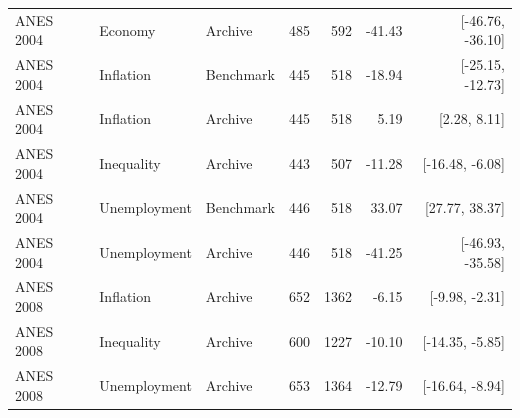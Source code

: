 \begin{longtable}{lllrrrr}
ANES 2004 & Economy & Archive & 485 &  592 & -41.43 & [-46.76, -36.10] \\
ANES 2004 & Inflation & Benchmark & 445 &  518 & -18.94 & [-25.15, -12.73] \\
ANES 2004 & Inflation & Archive & 445 &  518 & 5.19 & [2.28, 8.11] \\
ANES 2004 & Inequality & Archive & 443 &  507 & -11.28 & [-16.48, -6.08] \\
ANES 2004 & Unemployment & Benchmark & 446 &  518 & 33.07 & [27.77, 38.37] \\
ANES 2004 & Unemployment & Archive & 446 &  518 & -41.25 & [-46.93, -35.58] \\
ANES 2008 & Inflation & Archive & 652 & 1362 & -6.15 & [-9.98, -2.31] \\
ANES 2008 & Inequality & Archive & 600 & 1227 & -10.10 & [-14.35, -5.85] \\
ANES 2008 & Unemployment & Archive & 653 & 1364 & -12.79 & [-16.64, -8.94] \\
\end{longtable}
